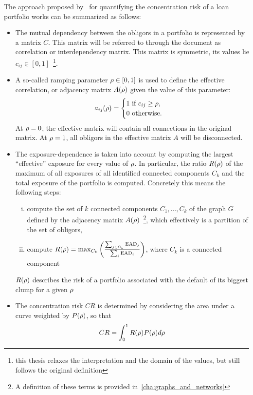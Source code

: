 \documentclass[12pt,beltcrest]{ociamthesis} %
\begin{document}
The approach proposed by~\cite{Sindel:2009vd} for quantifying the concentration risk of a loan portfolio works can be summarized as follows:
\begin{itemize}
	\item The mutual dependency between the obligors in a portfolio is represented by a matrix $C$.
	This matrix will be referred to through the document as correlation or interdependency matrix.
	This matrix is symmetric, its values lie $c_{ij} \in [0,1]$~\footnote{this thesis relaxes the interpretation and the domain of the values, but still follows the original definition}.

	\item A so-called ramping parameter $\rho \in [0,1]$ is used to define the effective correlation, or adjacency matrix $A(\rho)$ given the value of this  parameter:
	\begin{equation}
	a_{ij}(\rho) = 
		\begin{cases}
		1 \text{ if } c_{ij} \ge \rho,\\
		0 \text{ otherwise}.
		\end{cases}
	\end{equation}
	At $\rho = 0$, the effective matrix will contain all connections in the original matrix. At $\rho = 1$, all obligors in the effective matrix $A$ will be disconnected.
	
	\item The exposure-dependence is taken into account by computing the largest “effective” exposure for every value of $\rho$.
	In particular, the ratio $R(\rho)$ of the maximum of all exposures of all identified connected components $C_k$ and the total exposure of the portfolio is computed. Concretely this means the following steps:
	\begin{enumerate}[i)]
		\item compute the set of $k$ connected components $C_1,\ldots,C_k$ of the graph $G$ defined by the adjacency matrix $A(\rho)$~\footnote{A definition of these terms is provided in~\ref{cha:graphs_and_networks}}, which effectively is a partition of the set of obligors,
		\item compute $R(\rho) = \max_{C_k} \left(  \frac{\sum_{j\in C_k} \textrm{EAD}_j}{\sum_i \textrm{EAD}_i}  \right)$, where $C_k$ is a connected component
	\end{enumerate}
	$R(\rho)$ describes the risk of a portfolio associated with the default of its biggest clump for a given $\rho$
 
	\item The concentration risk $CR$ is determined by considering the area under a curve weighted by $P(\rho)$, so that 
	\begin{equation}
	 	CR = \int_0^1 R(\rho)P(\rho)d\rho
	 	\label{eq:ramping_integral}
	 \end{equation}
\end{itemize}
\end{document}
